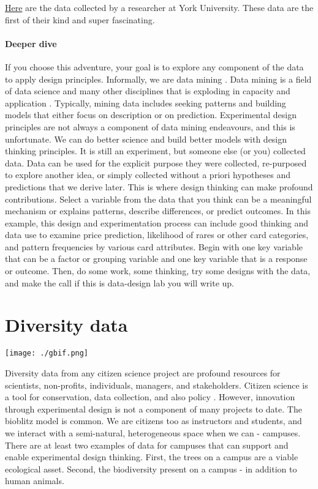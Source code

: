 \documentclass[
]{book}
\begin{document}
\href{https://figshare.com/articles/dataset/Magic_The_Gathering_Data/12797474}{Here} are the data collected by a researcher at York University. These data are the first of their kind and super fascinating.

\hypertarget{deeper-dive-3}{%
\subsubsection*{Deeper dive}\label{deeper-dive-3}}

If you choose this adventure, your goal is to explore any component of the data to apply design principles. Informally, we are data mining \citep{RN6800}. Data mining is a field of data science and many other disciplines that is exploding in capacity and application \citep{RN6802, RN6801}. Typically, mining data includes seeking patterns and building models that either focus on description or on prediction. Experimental design principles are not always a component of data mining endeavours, and this is unfortunate. We can do better science and build better models with design thinking principles. It is still an experiment, but someone else (or you) collected data. Data can be used for the explicit purpose they were collected, re-purposed to explore another idea, or simply collected without a priori hypotheses and predictions that we derive later. This is where design thinking can make profound contributions. Select a variable from the data that you think can be a meaningful mechanism or explains patterns, describe differences, or predict outcomes. In this example, this design and experimentation process can include good thinking and data use to examine price prediction, likelihood of rares or other card categories, and pattern frequencies by various card attributes. Begin with one key variable that can be a factor or grouping variable and one key variable that is a response or outcome. Then, do some work, some thinking, try some designs with the data, and make the call if this is data-design lab you will write up.

\hypertarget{diversity}{%
\chapter{Diversity data}\label{diversity}}

\texttt{[image: ./gbif.png]}

Diversity data from any citizen science project are profound resources for scientists, non-profits, individuals, managers, and stakeholders. Citizen science is a tool for conservation, data collection, and also policy \citep{RN1320, RN5997}. However, innovation through experimental design is not a component of many projects to date. The bioblitz model is common. We are citizens too as instructors and students, and we interact with a semi-natural, heterogeneous space when we can - campuses. There are at least two examples of data for campuses that can support and enable experimental design thinking. First, the trees on a campus are a viable ecological asset. Second, the biodiversity present on a campus - in addition to human animals.
\end{document}
